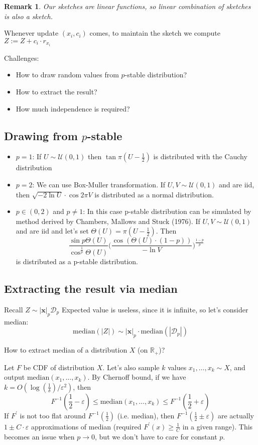\documentclass[11pt]{article}
\newtheorem{remark}[theorem]{Remark}
\begin{document}
\begin{remark}
  Our sketches are linear functions, so linear combination of sketches is also a sketch.
\end{remark}


\medskip
\noindent Whenever update $(x_i, c_i)$ comes, to maintain the sketch we compute $Z := Z + c_i \cdot r_{x_i}$ 

Challenges:
\begin{itemize}
 \item How to draw random values from $p$-stable distribution?
 \item How to extract the result?
 \item How much independence is required?
\end{itemize}
\subsection{Drawing from $p$-stable}
\begin{itemize}
\item $p=1$:  If $U \sim \mathcal{U}(0,1)$ then $\tan{\pi(U - \frac{1}{2})}$ is distributed with the Cauchy distribution
\item $p = 2$:
  We can use Box-Muller transformation. If $U, V \sim \mathcal{U}(0,1)$ and are iid, then $\sqrt{-2\ln{U}}\cdot\cos{2\pi V}$ is distributed as a normal distribution.
\item $p \in (0,2)$ and $p \neq 1$:
  In this case p-stable distribution can be simulated by method derived by Chambers, Mallows and Stuck (1976). 
  If $U, V \sim \mathcal{U}(0,1)$ and are iid and let's set $\Theta(U) = \pi (U - \frac{1}{2})$. Then 
  $$
  \frac{\sin{p\Theta(U)}}{\cos^{\frac{1}{p}}{\Theta(U)}} \Bigg(\frac{\cos{(\Theta(U)\cdot (1 - p))}}{- \ln V}\Bigg)^{\frac{1-p}{p}}
  $$
  is distributed as a p-stable distribution.
\end{itemize}

\subsection{Extracting the result via median}
Recall $Z \sim |\mathbf{x}|_p \mathcal{D}_p$
Expected value is useless, since it is infinite, so let's consider median: $$\textrm{median}(|Z|) \sim |\mathbf{x}|_p \cdot \textrm{median}(|\mathcal{D}_p|)$$ 

\medskip
\noindent How to extract median of a distribution $X$ (on $\mathbb{R}_+$)? 

Let $F$ be CDF of distribution $X$. Let's also sample $k$ values $x_1,\dots,x_k \sim X$, and output $\textrm{median}(x_1,\dots,x_k)$. 
By Chernoff bound, if we have
$k = O(\log(\frac{1}{\delta})/\varepsilon^2)$, then $$F^{-1}(\frac{1}{2}-\varepsilon) \leq \textrm{median}(x_1,\dots,x_k) \leq F^{-1}(\frac{1}{2}+\varepsilon)$$
\medskip
If $F^\prime$ is not too flat around $F^{-1}(\frac{1}{2})$ (i.e. median), then $F^{-1}(\frac{1}{2} \pm \varepsilon)$ are actually $1\pm C\cdot\varepsilon$ approximations of median (required $F^\prime(x) \geq \frac{1}{C}$ in a given range). This becomes an issue when $p \rightarrow 0$, but we don't have to care for constant $p$.
\end{document}
